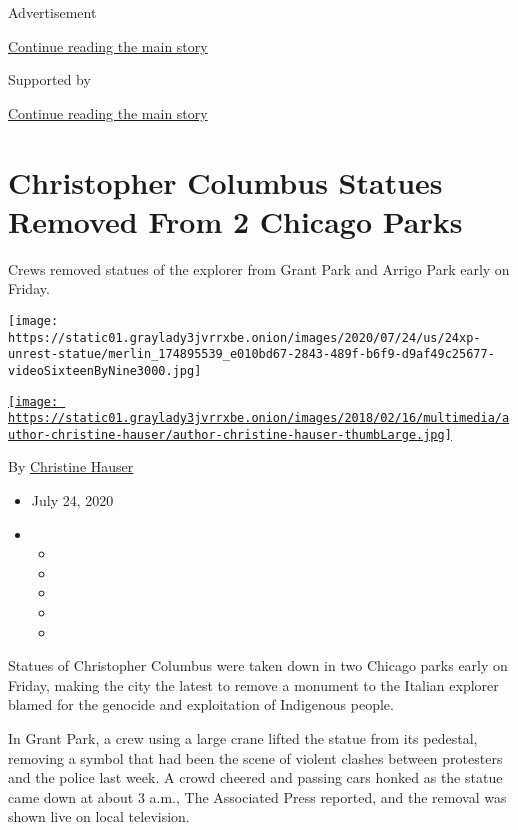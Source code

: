 Advertisement

\protect\hyperlink{after-top}{Continue reading the main story}

Supported by

\protect\hyperlink{after-sponsor}{Continue reading the main story}

\hypertarget{christopher-columbus-statues-removed-from-2-chicago-parks}{%
\section{Christopher Columbus Statues Removed From 2 Chicago
Parks}\label{christopher-columbus-statues-removed-from-2-chicago-parks}}

Crews removed statues of the explorer from Grant Park and Arrigo Park
early on Friday.

\texttt{[image: https://static01.graylady3jvrrxbe.onion/images/2020/07/24/us/24xp-unrest-statue/merlin\_174895539\_e010bd67-2843-489f-b6f9-d9af49c25677-videoSixteenByNine3000.jpg]}

\href{https://www.nytimes3xbfgragh.onion/by/christine-hauser}{\texttt{[image: https://static01.graylady3jvrrxbe.onion/images/2018/02/16/multimedia/author-christine-hauser/author-christine-hauser-thumbLarge.jpg]}}

By
\href{https://www.nytimes3xbfgragh.onion/by/christine-hauser}{Christine
Hauser}

\begin{itemize}
\item
  July 24, 2020
\item
  \begin{itemize}
  \item
  \item
  \item
  \item
  \item
  \end{itemize}
\end{itemize}

Statues of Christopher Columbus were taken down in two Chicago parks
early on Friday, making the city the latest to remove a monument to the
Italian explorer blamed for the genocide and exploitation of Indigenous
people.

In Grant Park, a crew using a large crane lifted the statue from its
pedestal, removing a symbol that had been the scene of violent clashes
between protesters and the police last week. A crowd cheered and passing
cars honked as the statue came down at about 3 a.m., The Associated
Press reported, and the removal was shown live on local television.

